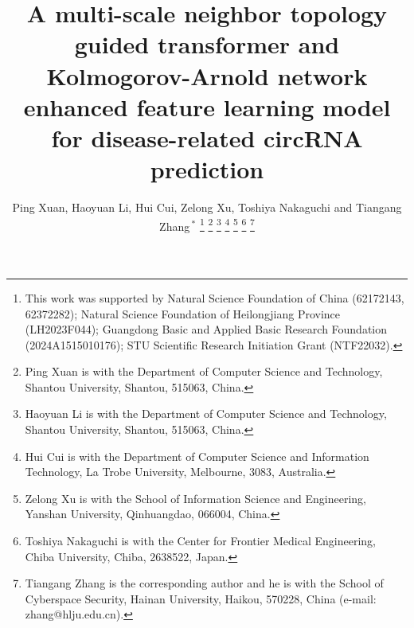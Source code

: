\documentclass[journal,twoside,web]{ieeecolor}
\begin{document}
\title{A multi-scale neighbor topology guided transformer and Kolmogorov-Arnold network enhanced feature learning model for disease-related circRNA prediction}
\author{Ping Xuan, Haoyuan Li, Hui Cui, Zelong Xu, Toshiya Nakaguchi and Tiangang Zhang\,$^{*}$
\thanks{This work was supported by Natural Science Foundation of China (62172143, 62372282); Natural Science Foundation of Heilongjiang Province (LH2023F044);
Guangdong Basic and Applied Basic Research Foundation (2024A1515010176); STU Scientific Research Initiation Grant (NTF22032).}
\thanks{Ping Xuan is with the Department of Computer Science and Technology, Shantou University, Shantou, 515063, China.}
\thanks{Haoyuan Li is with the Department of Computer Science and Technology, Shantou University, Shantou, 515063, China.}
\thanks{Hui Cui is with the Department of Computer Science and Information Technology, La Trobe University, Melbourne, 3083, Australia.}
\thanks{Zelong Xu is with the School of Information Science and Engineering, Yanshan University, Qinhuangdao, 066004, China.}
\thanks{Toshiya Nakaguchi is with the Center for Frontier Medical Engineering, Chiba University, Chiba, 2638522, Japan.}
\thanks{Tiangang Zhang is the corresponding author and he is with the School of Cyberspace Security, Hainan University, Haikou, 570228, China (e-mail: zhang@hlju.edu.cn).}
}

\maketitle
\end{document}
